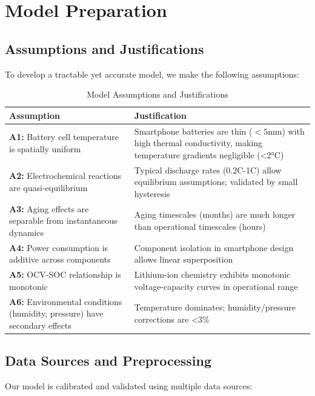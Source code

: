 \section{Model Preparation}

\subsection{Assumptions and Justifications}

To develop a tractable yet accurate model, we make the following assumptions:

\begin{table}[H]
\centering
\caption{Model Assumptions and Justifications}
\label{tab:assumptions}
\begin{tabular}{p{}p{}}
\toprule
\textbf{Assumption} & \textbf{Justification} \\
\midrule
\textbf{A1:} Battery cell temperature is spatially uniform & Smartphone batteries are thin ($<5$mm) with high thermal conductivity, making temperature gradients negligible (<2°C) \\
\midrule
\textbf{A2:} Electrochemical reactions are quasi-equilibrium & Typical discharge rates (0.2C-1C) allow equilibrium assumptions; validated by small hysteresis \\
\midrule
\textbf{A3:} Aging effects are separable from instantaneous dynamics & Aging timescales (months) are much longer than operational timescales (hours) \\
\midrule
\textbf{A4:} Power consumption is additive across components & Component isolation in smartphone design allows linear superposition \\
\midrule
\textbf{A5:} OCV-SOC relationship is monotonic & Lithium-ion chemistry exhibits monotonic voltage-capacity curves in operational range \\
\midrule
\textbf{A6:} Environmental conditions (humidity, pressure) have secondary effects & Temperature dominates; humidity/pressure corrections are <3\% \\
\bottomrule
\end{tabular}
\end{table}

\subsection{Data Sources and Preprocessing}

Our model is calibrated and validated using multiple data sources:

